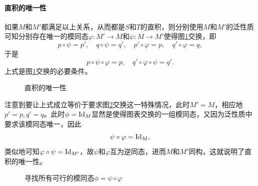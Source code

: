 \documentclass{article}
\theoremstyle{kai-theorem}
\begin{document}
\paragraph{直积的唯一性} 如果$ M $和$ M' $都满足以上关系，从而都是$ S $和$ T $的直积，则分别使用$ M $和$ M' $的泛性质可知分别存在唯一的模同态$ \varphi:M'\to M $和$ \psi:M\to M' $使得图\ref{fig:uniqueness_of_product}交换，即
\[
    p\circ \psi = p',\quad q\circ \psi = q',\quad p'\circ \varphi = p,\quad q'\circ \varphi = q,
\]
于是
\[
    p\circ \psi\circ \varphi = p,\quad q'\circ \varphi\circ \psi = q'.
\]
上式是图\ref{fig:uniqueness_of_product}交换的必要条件。

\begin{figure}[htpb]
    \centering
    \caption{直积的唯一性}
    \label{fig:uniqueness_of_product}
\end{figure}

注意到要让上式成立等价于要求图\ref{fig:uniqueness_of_product_necessary}交换这一特殊情况，此时$ M'=M $，相应地$ p'=p,q'=q $。此时$ \phi={\rm Id}_M $显然是使得图表交换的一组模同态，又因为泛性质中要求该模同态唯一，因此
\[
    \psi\circ \varphi = {\rm Id}_M,
\]
类似地可知$ \varphi\circ \psi = {\rm Id}_{M'} $，故$ \psi $和$ \varphi $互为逆同态，进而$ M $和$ M' $同构，这就说明了直积的唯一性。

\begin{figure}[htpb]
    \centering
    \caption{寻找所有可行的模同态$ \phi = \psi\circ \varphi $}
    \label{fig:uniqueness_of_product_necessary}
\end{figure}
\end{document}
